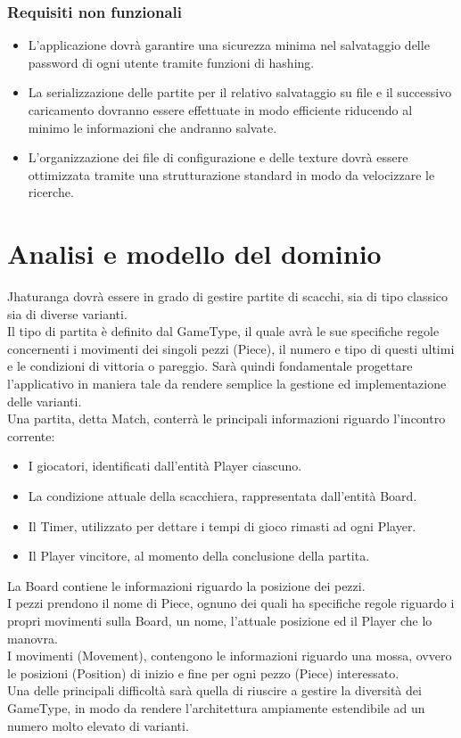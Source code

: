 \documentclass[a4paper,12pt]{report}
\begin{document}
\subsubsection{Requisiti non funzionali}
\begin{itemize}
	\item L’applicazione dovrà garantire una sicurezza minima nel salvataggio delle password di ogni utente tramite funzioni di hashing.
	\item La serializzazione delle partite per il relativo salvataggio su file e il successivo caricamento dovranno essere effettuate in modo efficiente riducendo al minimo le informazioni che andranno salvate.
	\item L'organizzazione dei file di configurazione e delle texture dovrà essere ottimizzata tramite una strutturazione standard in modo da velocizzare le ricerche.
\end{itemize}

\section{Analisi e modello del dominio}

Jhaturanga dovrà essere in grado di gestire partite di scacchi, sia di tipo classico sia di diverse varianti.
\\
Il tipo di partita è definito dal GameType, il quale avrà le sue specifiche regole concernenti i movimenti dei singoli pezzi (Piece), il numero e tipo di questi ultimi e le condizioni di vittoria o pareggio.
Sarà quindi fondamentale progettare l'applicativo in maniera tale da rendere semplice la gestione ed implementazione delle varianti.
\\
Una partita, detta Match, conterrà le principali informazioni riguardo l'incontro corrente:
\begin{itemize}
    \item I giocatori, identificati dall'entità Player ciascuno.
    \item La condizione attuale della scacchiera, rappresentata dall'entità Board.
    \item Il Timer, utilizzato per dettare i tempi di gioco rimasti ad ogni Player.
    \item Il Player vincitore, al momento della conclusione della partita.
\end{itemize}
La Board contiene le informazioni riguardo la posizione dei pezzi.
\\
I pezzi prendono il nome di Piece, ognuno dei quali ha specifiche regole riguardo i propri movimenti sulla Board, un nome, l'attuale posizione ed il Player che lo manovra.
\\I movimenti (Movement), contengono le informazioni riguardo una mossa, ovvero le posizioni (Position) di inizio e fine per ogni pezzo (Piece) interessato.
\\
Una delle principali difficoltà sarà quella di riuscire a gestire la diversità dei GameType, in modo da rendere l'architettura ampiamente estendibile ad un numero molto elevato di varianti.
\end{document}
